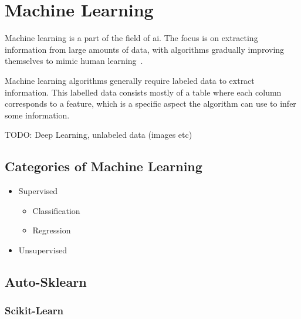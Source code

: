 \section{Machine Learning}
Machine learning is a part of the field of \ac{ai}. The focus is on extracting information from large amounts of data, with algorithms gradually improving themselves to mimic human learning~\cite{what-is-ml}.

Machine learning algorithms generally require labeled data to extract information. This labelled data consists mostly of a table where each column corresponds to a feature, which is a specific aspect the algorithm can use to infer some information. %

TODO: Deep Learning, unlabeled data (images etc)
\subsection{Categories of Machine Learning}
\begin{itemize}
  \item Supervised
        \begin{itemize}
          \item Classification
          \item Regression
        \end{itemize}
  \item Unsupervised
\end{itemize}

\subsection{Auto-Sklearn}
\subsubsection{Scikit-Learn} %